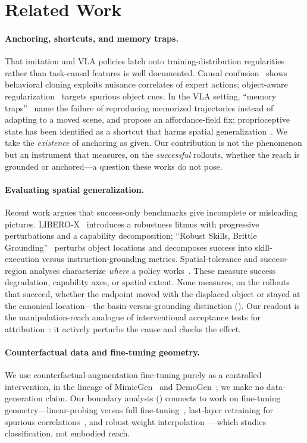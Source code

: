\section{Related Work}
\label{sec:related}

\paragraph{Anchoring, shortcuts, and memory traps.}
That imitation and VLA policies latch onto training-distribution regularities rather than
task-causal features is well documented. Causal confusion~\citep{dehaan2019causal} shows
behavioral cloning exploits nuisance correlates of expert actions; object-aware
regularization~\citep{park2021object} targets spurious object cues. In the VLA setting,
``memory traps''~\citep{afi2025memory} name the failure of reproducing memorized
trajectories instead of adapting to a moved scene, and propose an affordance-field fix;
proprioceptive state has been identified as a shortcut that harms spatial
generalization~\citep{proprio2025}. We take the \emph{existence} of anchoring as given.
Our contribution is not the phenomenon but an instrument that measures, on the
\emph{successful} rollouts, whether the reach is grounded or anchored---a question these
works do not pose.

\paragraph{Evaluating spatial generalization.}
Recent work argues that success-only benchmarks give incomplete or misleading pictures.
LIBERO-X~\citep{liberox2026} introduces a robustness litmus with progressive perturbations
and a capability decomposition; ``Robust Skills, Brittle Grounding''~\citep{robustskills2026}
perturbs object locations and decomposes success into skill-execution versus
instruction-grounding metrics. Spatial-tolerance and success-region analyses characterize
\emph{where} a policy works~\citep{mobipi2025,n2m2025,manibox2024}. These measure success
degradation, capability axes, or spatial extent. None measures, on the rollouts that
succeed, whether the endpoint moved with the displaced object or stayed at the canonical
location---the basin-versus-grounding distinction (). Our readout is the
manipulation-reach analogue of interventional acceptance tests for
attribution~\citep{adebayo2018sanity}: it actively perturbs the cause and checks the
effect.

\paragraph{Counterfactual data and fine-tuning geometry.}
We use counterfactual-augmentation fine-tuning purely as a controlled intervention, in the
lineage of MimicGen~\citep{mandlekar2023mimicgen} and DemoGen~\citep{demogen2025}; we make
no data-generation claim. Our boundary analysis () connects to work on
fine-tuning geometry---linear-probing versus full fine-tuning~\citep{kumar2022finetuning},
last-layer retraining for spurious correlations~\citep{kirichenko2023last}, and robust
weight interpolation~\citep{wortsman2022wise}---which studies classification, not embodied
reach.

